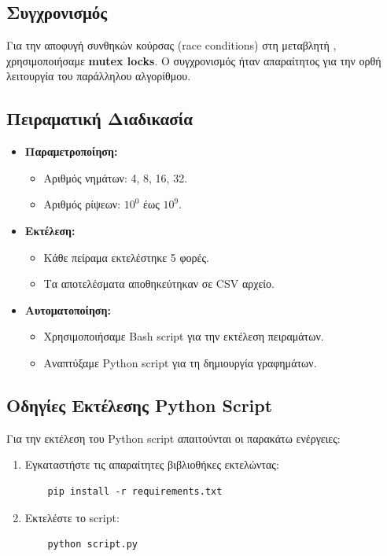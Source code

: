 \documentclass{article}
\begin{document}
\subsection*{Συγχρονισμός}
Για την αποφυγή συνθηκών κούρσας (race conditions) στη μεταβλητή , χρησιμοποιήσαμε \textbf{mutex locks}. Ο συγχρονισμός ήταν απαραίτητος για την ορθή λειτουργία του παράλληλου αλγορίθμου.
\subsection*{Πειραματική Διαδικασία}
\begin{itemize}
    \item \textbf{Παραμετροποίηση:}
    \begin{itemize}
        \item Αριθμός νημάτων: 4, 8, 16, 32.
        \item Αριθμός ρίψεων: $10^0$ έως $10^{9}$.
    \end{itemize}
    \item \textbf{Εκτέλεση:}
    \begin{itemize}
        \item Κάθε πείραμα εκτελέστηκε 5 φορές.
        \item Τα αποτελέσματα αποθηκεύτηκαν σε CSV αρχείο.
    \end{itemize}
    \item \textbf{Αυτοματοποίηση:}
    \begin{itemize}
        \item Χρησιμοποιήσαμε Bash script για την εκτέλεση πειραμάτων.
        \item Αναπτύξαμε Python script για τη δημιουργία γραφημάτων.
    \end{itemize}
\end{itemize}
\subsection*{Οδηγίες Εκτέλεσης Python Script}
Για την εκτέλεση του Python script απαιτούνται οι παρακάτω ενέργειες:
\begin{enumerate}
    \item Εγκαταστήστε τις απαραίτητες βιβλιοθήκες εκτελώντας:
    \begin{verbatim}
    pip install -r requirements.txt
    \end{verbatim}
    \item Εκτελέστε το script:
    \begin{verbatim}
    python script.py
    \end{verbatim}
\end{enumerate}
\end{document}
